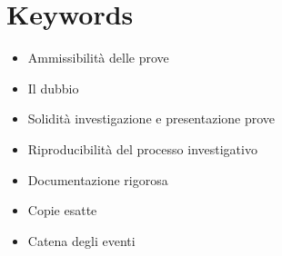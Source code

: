 \chapter*{Keywords}
\begin{itemize}
    \item Ammissibilità delle prove
    \item Il dubbio
    \item Solidità investigazione e presentazione prove
    \item Riproducibilità del processo investigativo
    \item Documentazione rigorosa
    \item Copie esatte
    \item Catena degli eventi
\end{itemize}